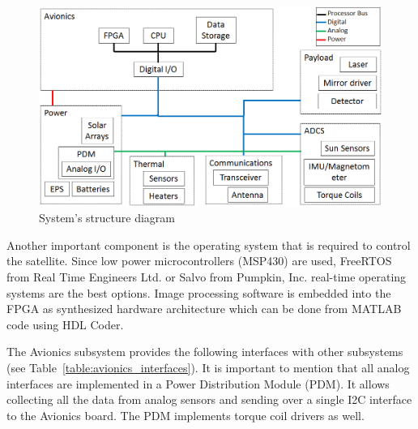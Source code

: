 \documentclass[12pt]{article}
\begin{document}
\begin{figure}[ht]
\centering
  \includegraphics[width=7in]{images/Avionics_fig2.PNG}
\caption{System's structure diagram}
\label{fig:avionics_architecture}
\end{figure}

Another important component is the operating system that is required to control the satellite. Since low power microcontrollers (MSP430) are used, FreeRTOS from Real Time Engineers Ltd. \cite{avionics_RTOS} or Salvo from Pumpkin, Inc. \cite{avionics_pumpkin} real-time operating systems are the best options. Image processing software is embedded into the FPGA as synthesized hardware architecture which can be done from MATLAB code using HDL Coder.

The Avionics subsystem provides the following interfaces with other subsystems (see Table~\ref{table:avionics_interfaces}). It is important to mention that all analog interfaces are implemented in a Power Distribution Module (PDM). It allows collecting all the data from analog sensors and sending over a single I2C interface to the Avionics board. The PDM implements torque coil drivers as well.
\end{document}
